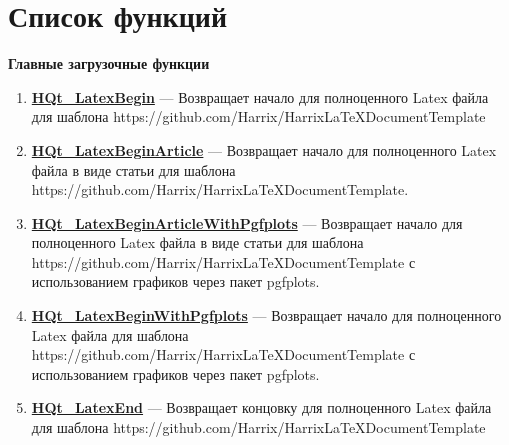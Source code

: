 \documentclass[a4paper,12pt]{article}
\begin{document}
\section{Список функций}\label{section_listfunctions}
\textbf{Главные загрузочные функции}
\begin{enumerate}

\item \textbf{\hyperref[HQt_LatexBegin]{HQt\_LatexBegin}} --- Возвращает начало для полноценного Latex файла для шаблона https://github.com/Harrix/HarrixLaTeXDocumentTemplate

\item \textbf{\hyperref[HQt_LatexBeginArticle]{HQt\_LatexBeginArticle}} --- Возвращает начало для полноценного Latex файла в виде статьи для шаблона https://github.com/Harrix/HarrixLaTeXDocumentTemplate.

\item \textbf{\hyperref[HQt_LatexBeginArticleWithPgfplots]{HQt\_LatexBeginArticleWithPgfplots}} --- Возвращает начало для полноценного Latex файла в виде статьи для шаблона https://github.com/Harrix/HarrixLaTeXDocumentTemplate с использованием графиков через пакет pgfplots.

\item \textbf{\hyperref[HQt_LatexBeginWithPgfplots]{HQt\_LatexBeginWithPgfplots}} --- Возвращает начало для полноценного Latex файла для шаблона https://github.com/Harrix/HarrixLaTeXDocumentTemplate с использованием графиков через пакет pgfplots.

\item \textbf{\hyperref[HQt_LatexEnd]{HQt\_LatexEnd}} --- Возвращает концовку для полноценного Latex файла для шаблона https://github.com/Harrix/HarrixLaTeXDocumentTemplate

\end{enumerate}
\end{document}
